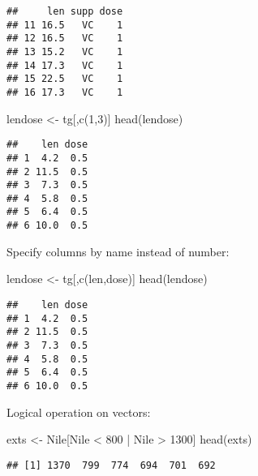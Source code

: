 \documentclass[
]{article}
\newenvironment{Shaded}{\begin{snugshade}}{\end{snugshade}}
\newcommand{\DecValTok}[1]{\textcolor[rgb]{0.00,0.00,0.81}{#1}}
\newcommand{\FunctionTok}[1]{\textcolor[rgb]{0.00,0.00,0.00}{#1}}
\newcommand{\NormalTok}[1]{#1}
\newcommand{\OtherTok}[1]{\textcolor[rgb]{0.56,0.35,0.01}{#1}}
\newcommand{\SpecialCharTok}[1]{\textcolor[rgb]{0.00,0.00,0.00}{#1}}
\newcommand{\StringTok}[1]{\textcolor[rgb]{0.31,0.60,0.02}{#1}}
\begin{document}
\begin{verbatim}
##     len supp dose
## 11 16.5   VC    1
## 12 16.5   VC    1
## 13 15.2   VC    1
## 14 17.3   VC    1
## 15 22.5   VC    1
## 16 17.3   VC    1
\end{verbatim}

\begin{Shaded}
\begin{Highlighting}[]
\NormalTok{lendose }\OtherTok{\textless{}{-}}\NormalTok{ tg[,}\FunctionTok{c}\NormalTok{(}\DecValTok{1}\NormalTok{,}\DecValTok{3}\NormalTok{)]}
\FunctionTok{head}\NormalTok{(lendose)}
\end{Highlighting}
\end{Shaded}

\begin{verbatim}
##    len dose
## 1  4.2  0.5
## 2 11.5  0.5
## 3  7.3  0.5
## 4  5.8  0.5
## 5  6.4  0.5
## 6 10.0  0.5
\end{verbatim}

Specify columns by name instead of number:

\begin{Shaded}
\begin{Highlighting}[]
\NormalTok{lendose }\OtherTok{\textless{}{-}}\NormalTok{ tg[,}\FunctionTok{c}\NormalTok{(}\StringTok{\textquotesingle{}len\textquotesingle{}}\NormalTok{,}\StringTok{\textquotesingle{}dose\textquotesingle{}}\NormalTok{)]}
\FunctionTok{head}\NormalTok{(lendose)}
\end{Highlighting}
\end{Shaded}

\begin{verbatim}
##    len dose
## 1  4.2  0.5
## 2 11.5  0.5
## 3  7.3  0.5
## 4  5.8  0.5
## 5  6.4  0.5
## 6 10.0  0.5
\end{verbatim}

Logical operation on vectors:

\begin{Shaded}
\begin{Highlighting}[]
\NormalTok{exts }\OtherTok{\textless{}{-}}\NormalTok{ Nile[Nile }\SpecialCharTok{\textless{}} \DecValTok{800} \SpecialCharTok{|}\NormalTok{ Nile }\SpecialCharTok{\textgreater{}} \DecValTok{1300}\NormalTok{]}
\FunctionTok{head}\NormalTok{(exts)}
\end{Highlighting}
\end{Shaded}

\begin{verbatim}
## [1] 1370  799  774  694  701  692
\end{verbatim}
\end{document}
